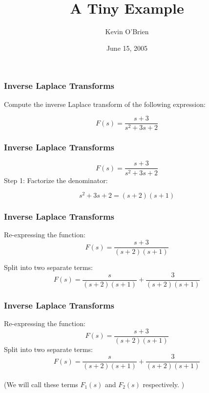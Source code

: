 \documentclass{beamer}
\title{A Tiny Example}
\author{Kevin O'Brien}
\date{June 15, 2005}
\begin{document}
\maketitle
\begin{frame}
\frametitle{Inverse Laplace Transforms} 

Compute the inverse Laplace transform of the following expression:
{
\large
\[ F(s) = \frac{s+3}{s^2+3s+2} \]

}\end{frame}
\begin{frame}
\frametitle{Inverse Laplace Transforms} 
{
\large
\[ F(s) = \frac{s+3}{s^2+3s+2} \]
}
Step 1: Factorize the denominator:

{
\large
\[s^2+3s+2 = (s+2)(s+1)\]
}

\end{frame}
\begin{frame}
\frametitle{Inverse Laplace Transforms} 
Re-expressing the function:
{
\large
\[ F(s) = \frac{s+3}{(s+2)(s+1)} \]
}

Split into two separate terms:
{
\large
\[ F(s) = \frac{s}{(s+2)(s+1)} + \frac{3}{(s+2)(s+1)} \]
}

\end{frame}
\begin{frame}
\frametitle{Inverse Laplace Transforms} 
\vspace{-0.5cm}
Re-expressing the function:
{
\large
\[ F(s) = \frac{s+3}{(s+2)(s+1)} \]
}
Split into two separate terms:
{
\large
\[ F(s) = \frac{s}{(s+2)(s+1)} + \frac{3}{(s+2)(s+1)} \]
}
\\
\vspace{1cm}
(We will call these terms $F_1(s)$ and $F_2(s)$ respectively. )
\end{frame}
\end{document}
